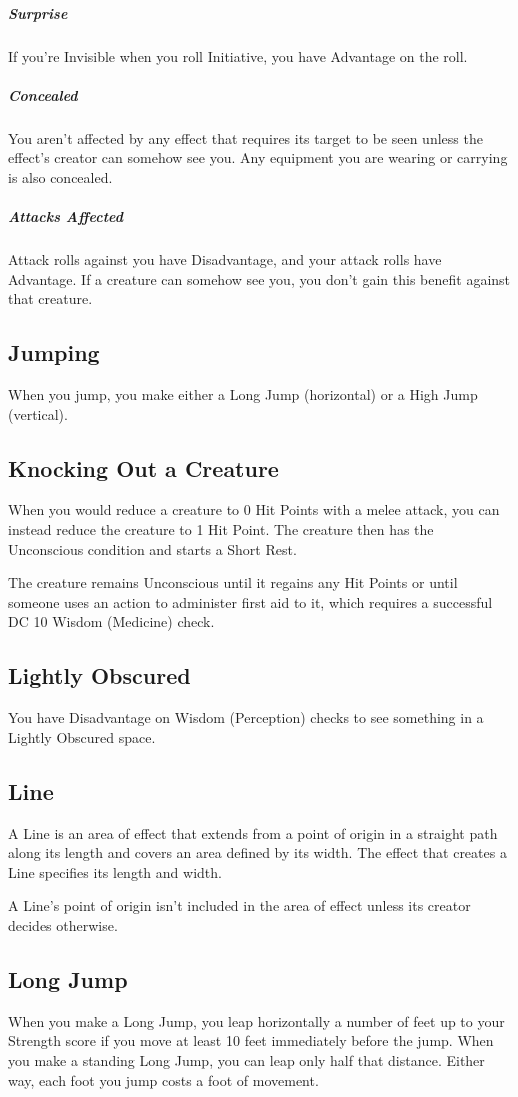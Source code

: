 \documentclass[10pt,a4paper,twoside,bg=print,twocolumn,openany,nodeprecatedcode]{dndarticle}
\begin{document}
\subparagraph{Surprise}
If you're Invisible when you roll Initiative, you have Advantage on the roll.

\subparagraph{Concealed}
You aren't affected by any effect that requires its target to be seen unless the effect's creator can somehow see you. Any equipment you are wearing or carrying is also concealed.

\subparagraph{Attacks Affected}
Attack rolls against you have Disadvantage, and your attack rolls have Advantage. If a creature can somehow see you, you don't gain this benefit against that creature.

\subsection{Jumping}
When you jump, you make either a Long Jump (horizontal) or a High Jump (vertical).

\subsection{Knocking Out a Creature}
When you would reduce a creature to 0 Hit Points with a melee attack, you can instead reduce the creature to 1 Hit Point. The creature then has the Unconscious condition and starts a Short Rest.

The creature remains Unconscious until it regains any Hit Points or until someone uses an action to administer first aid to it, which requires a successful DC 10 Wisdom (Medicine) check.

\subsection{Lightly Obscured}
You have Disadvantage on Wisdom (Perception) checks to see something in a Lightly Obscured space.

\subsection{Line}
A Line is an area of effect that extends from a point of origin in a straight path along its length and covers an area defined by its width. The effect that creates a Line specifies its length and width.

A Line's point of origin isn't included in the area of effect unless its creator decides otherwise.

\subsection{Long Jump}
When you make a Long Jump, you leap horizontally a number of feet up to your Strength score if you move at least 10 feet immediately before the jump. When you make a standing Long Jump, you can leap only half that distance. Either way, each foot you jump costs a foot of movement.
\end{document}

